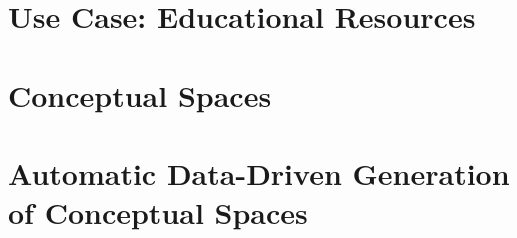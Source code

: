 \documentclass[11pt,
  paper=a4, 
  hidelinks,
  bibliography=totocnumbered,
	captions=tableheading,
	BCOR=10mm
]{scrreprt}
\theoremstyle{definition}
\begin{document}
\section{Use Case: Educational Resources}

\section{Conceptual Spaces}









\section{Automatic Data-Driven Generation of Conceptual Spaces}

\end{document}
